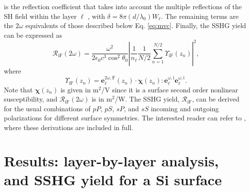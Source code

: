\documentclass[utf8]{frontiersSCNS}
\begin{document}
is the reflection coefficient that takes into account the multiple reflections
of the SH field within the layer $\ell$ , with $\delta =
8\pi(d/\lambda_{0})W_{\ell}$. The remaining terms are the $2\omega$ equivalents
of those described below Eq. \eqref{eq:mvc}. Finally, the SSHG yield can be
expressed as
\begin{equation}\label{eq:mc6}
\mathcal{R}_{\mathrm{iF}}(2\omega) 
=
\frac{\omega^{2}}{2\epsilon_{0}c^3\cos^{2}\theta_{0}}
\left\vert\frac{1}{n_{\ell}}
\frac{1}{N/2}
\sum_{n=1}^{N/2}
\Upsilon_{\mathrm{iF}}(z_{n})
\right\vert^{2},
\end{equation}
where
\begin{equation}\label{ez.3}
\Upsilon_{\mathrm{iF}}(z_{n}) =
\mathbf{e}^{2\omega,\mathrm{F}}_{\ell}(z_{n})\cdot 
\boldsymbol{\chi}(z_{n}) : 
\mathbf{e}^{\omega,\mathrm{i}}_{\ell}
\mathbf{e}^{\omega,\mathrm{i}}_{\ell}.
\end{equation}
Note that $\boldsymbol{\chi}(z_{n})$ is given in m$^{2}$/V since it is a surface
second order nonlinear susceptibility, and $\mathcal{R}_{\mathrm{iF}}(2\omega)$
is in m$^{2}$/W. The SSHG yield, $\mathcal{R}_{\mathrm{iF}}$, can be derived for
the usual combinations of $pP$, $pS$, $sP$, and $sS$ incoming and outgoing
polarizations for different surface symmetries. The interested reader can refer
to \cite{andersonPRB16b}, where these derivations are included in full.



\section{Results: layer-by-layer analysis, and SSHG yield for a Si surface}
\label{res}
\end{document}
